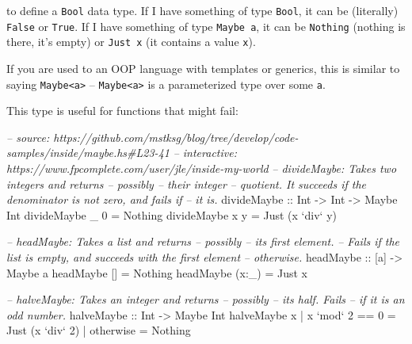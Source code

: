 \documentclass[]{article}
\newenvironment{Shaded}{}{}
\newcommand{\DataTypeTok}[1]{\textcolor[rgb]{0.56,0.13,0.00}{{#1}}}
\newcommand{\DecValTok}[1]{\textcolor[rgb]{0.25,0.63,0.44}{{#1}}}
\newcommand{\CommentTok}[1]{\textcolor[rgb]{0.38,0.63,0.69}{\textit{{#1}}}}
\newcommand{\OtherTok}[1]{\textcolor[rgb]{0.00,0.44,0.13}{{#1}}}
\newcommand{\FunctionTok}[1]{\textcolor[rgb]{0.02,0.16,0.49}{{#1}}}
\newcommand{\NormalTok}[1]{{#1}}
\begin{document}
to define a \texttt{Bool} data type. If I have something of type \texttt{Bool}, it can be
(literally) \texttt{False} or \texttt{True}. If I have something of type \texttt{Maybe\ a}, it can
be \texttt{Nothing} (nothing is there, it's empty) or \texttt{Just\ x} (it contains a value
\texttt{x}).

If you are used to an OOP language with templates or generics, this is similar to saying
\texttt{Maybe\textless{}a\textgreater{}} -- \texttt{Maybe\textless{}a\textgreater{}} is a
parameterized type over some \texttt{a}.

This type is useful for functions that might fail:

\begin{Shaded}
\begin{Highlighting}[]
\CommentTok{-- source: https://github.com/mstksg/blog/tree/develop/code-samples/inside/maybe.hs#L23-41}
\CommentTok{-- interactive: https://www.fpcomplete.com/user/jle/inside-my-world}
\CommentTok{-- divideMaybe: Takes two integers and returns -- possibly -- their integer}
\CommentTok{--      quotient. It succeeds if the denominator is not zero, and fails if}
\CommentTok{--      it is.}
\OtherTok{divideMaybe ::} \DataTypeTok{Int} \OtherTok{->} \DataTypeTok{Int} \OtherTok{->} \DataTypeTok{Maybe} \DataTypeTok{Int}
\NormalTok{divideMaybe _ }\DecValTok{0} \FunctionTok{=} \DataTypeTok{Nothing}
\NormalTok{divideMaybe x y }\FunctionTok{=} \DataTypeTok{Just} \NormalTok{(x }\OtherTok{`div`} \NormalTok{y)}

\CommentTok{-- headMaybe: Takes a list and returns -- possibly -- its first element.}
\CommentTok{--      Fails if the list is empty, and succeeds with the first element}
\CommentTok{--      otherwise.}
\OtherTok{headMaybe ::} \NormalTok{[a] }\OtherTok{->} \DataTypeTok{Maybe} \NormalTok{a}
\NormalTok{headMaybe []    }\FunctionTok{=} \DataTypeTok{Nothing}
\NormalTok{headMaybe (x}\FunctionTok{:}\NormalTok{_) }\FunctionTok{=} \DataTypeTok{Just} \NormalTok{x}

\CommentTok{-- halveMaybe: Takes an integer and returns -- possibly -- its half.  Fails}
\CommentTok{--      if it is an odd number.}
\OtherTok{halveMaybe ::} \DataTypeTok{Int} \OtherTok{->} \DataTypeTok{Maybe} \DataTypeTok{Int}
\NormalTok{halveMaybe x }\FunctionTok{|} \NormalTok{x }\OtherTok{`mod`} \DecValTok{2} \FunctionTok{==} \DecValTok{0} \FunctionTok{=} \DataTypeTok{Just} \NormalTok{(x }\OtherTok{`div`} \DecValTok{2}\NormalTok{)}
             \FunctionTok{|} \NormalTok{otherwise      }\FunctionTok{=} \DataTypeTok{Nothing}
\end{Highlighting}
\end{Shaded}
\end{document}
